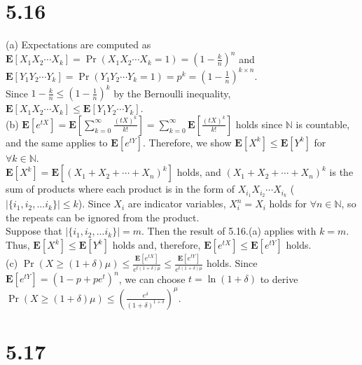 \documentclass{article}
\begin{document}
\section*{5.16}
(a) Expectations are computed as $\textbf{E}[X_1X_2\cdots X_k]=\Pr(X_1X_2\cdots X_k=1)=(1-\frac{k}{n})^n$ 
and $\textbf{E}[Y_1Y_2\cdots Y_k]=\Pr(Y_1Y_2\cdots Y_k=1)=p^k=(1-\frac{1}{n})^{k\times n}$.\\
Since $1-\frac{k}{n}\leq (1-\frac{1}{n})^k$ by the Bernoulli inequality, $\textbf{E}[X_1X_2\cdots X_k]\leq \textbf{E}[Y_1Y_2\cdots Y_k]$.\\
(b) $\textbf{E}[e^{tX}]=\textbf{E}\left[\sum\limits_{k=0}^\infty\frac{(tX)^k}{k!}\right]=\sum\limits_{k=0}^\infty\textbf{E}[\frac{(tX)^k}{k!}]$
holds since $\mathbb{N}$ is countable, and the same applies to $\textbf{E}[e^{tY}]$.
Therefore, we show $\textbf{E}[X^k]\leq\textbf{E}[Y^k]$ for $\forall k\in \mathbb{N}$.\\
$\textbf{E}[X^k]=\textbf{E}[(X_1+X_2+\cdots+X_n)^k]$ holds, and $(X_1+X_2+\cdots+X_n)^k$ is the sum of products where each product is in the form of $X_{i_1}X_{i_2}\cdots X_{i_k}$ ($|\{i_1,i_2,...i_k\}|\leq k$).
Since $X_i$ are indicator variables, $X_i^n=X_i$ holds for $\forall n \in \mathbb{N}$, so the repeats can be ignored from the product.\\
Suppose that $|\{i_1,i_2,...i_k\}|=m$. Then the result of 5.16.(a) applies with $k=m$. Thus, $\textbf{E}[X^k]\leq\textbf{E}[Y^k]$ holds and, therefore, $\textbf{E}[e^{tX}]\leq\textbf{E}[e^{tY}]$ holds.\\
(c) $\Pr(X\geq(1+\delta)\mu)\leq\frac{\textbf{E}[e^{tX}]}{e^{t(1+\delta)\mu}}\leq\frac{\textbf{E}[e^{tY}]}{e^{t(1+\delta)\mu}}$ holds. 
Since $\textbf{E}[e^{tY}]=(1-p+pe^t)^n$, we can choose $t=\ln(1+\delta)$ to derive $\Pr(X\geq(1+\delta)\mu)\leq\left(\frac{e^\delta}{(1+\delta)^{1+\delta}}\right)^\mu$.
\section*{5.17}
\end{document}
